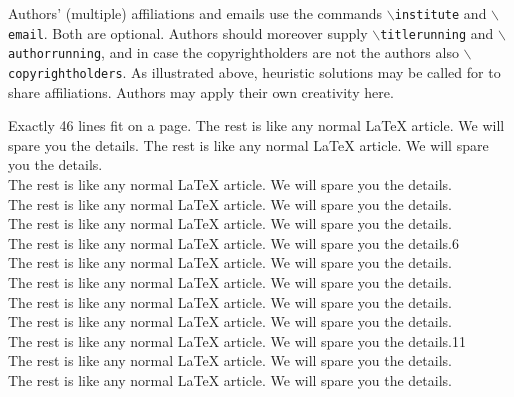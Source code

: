 \documentclass[submission,copyright,creativecommons]{eptcs}
\begin{document}
Authors' (multiple) affiliations and emails use the commands
{\tt $\backslash$institute} and {\tt $\backslash$email}.
Both are optional.
Authors should moreover supply
{\tt $\backslash$titlerunning} and {\tt $\backslash$authorrunning},
and in case the copyrightholders are not the authors also
{\tt $\backslash$copyrightholders}.
As illustrated above, heuristic solutions may be called for to share
affiliations. Authors may apply their own creativity here.

Exactly 46 lines fit on a page.
The rest is like any normal {\LaTeX} article.
We will spare you the details.
The rest is like any normal {\LaTeX} article.
We will spare you the details.\\
The rest is like any normal {\LaTeX} article.
We will spare you the details.\\
The rest is like any normal {\LaTeX} article.
We will spare you the details.\\
The rest is like any normal {\LaTeX} article.
We will spare you the details.\\
The rest is like any normal {\LaTeX} article.
We will spare you the details.\hfill6\\
The rest is like any normal {\LaTeX} article.
We will spare you the details.\\
The rest is like any normal {\LaTeX} article.
We will spare you the details.\\
The rest is like any normal {\LaTeX} article.
We will spare you the details.\\
The rest is like any normal {\LaTeX} article.
We will spare you the details.\\
The rest is like any normal {\LaTeX} article.
We will spare you the details.\hfill11\\
The rest is like any normal {\LaTeX} article.
We will spare you the details.\\
The rest is like any normal {\LaTeX} article.
We will spare you the details.
\end{document}
